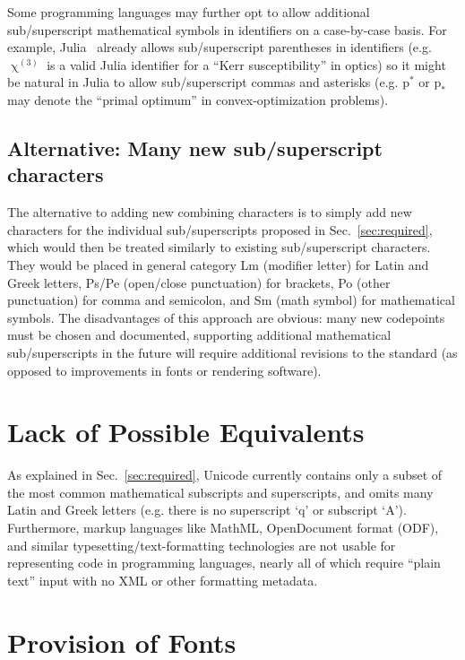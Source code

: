 \documentclass[10pt,english]{article}
\newcommand{\secref}[1]{Sec.~\ref{sec:#1}}
\begin{document}
Some programming languages may further opt to allow additional sub/superscript mathematical symbols in identifiers on a case-by-case basis. For example, Julia~\cite{Julia} already allows sub/superscript parentheses in identifiers (e.g. $\upchi^{(3)}$ is a valid Julia identifier for a ``Kerr susceptibility'' in optics) so it might be natural in Julia to allow sub/superscript commas and asterisks (e.g. $\mathrm{p}^*$ or $\mathrm{p}_*$ may denote the ``primal optimum'' in convex-optimization problems).

\subsection{Alternative: Many new sub/superscript characters}

The alternative to adding new combining characters is to simply add new characters for the individual sub/superscripts proposed in \secref{required}, which would then be treated similarly to existing sub/superscript characters.  They would be placed in general category Lm (modifier letter) for Latin and Greek letters, Ps/Pe (open/close punctuation) for brackets, Po (other punctuation) for comma and semicolon, and Sm (math symbol) for mathematical symbols.   The disadvantages of this approach are obvious: many new codepoints must be chosen and documented, supporting additional mathematical sub/superscripts in the future will require additional revisions to the standard (as opposed to improvements in fonts or rendering software).

\section{Lack of Possible Equivalents}

As explained in \secref{required}, Unicode currently contains only a subset of the most common mathematical subscripts and superscripts, and omits many Latin and Greek letters (e.g. there is no superscript `q' or subscript `A').  Furthermore, markup languages like MathML, OpenDocument format (ODF), and similar typesetting/text-formatting technologies are not usable for representing code in programming languages, nearly all of which require ``plain text'' input with no XML or other formatting metadata.

\section{Provision of Fonts}
\end{document}
